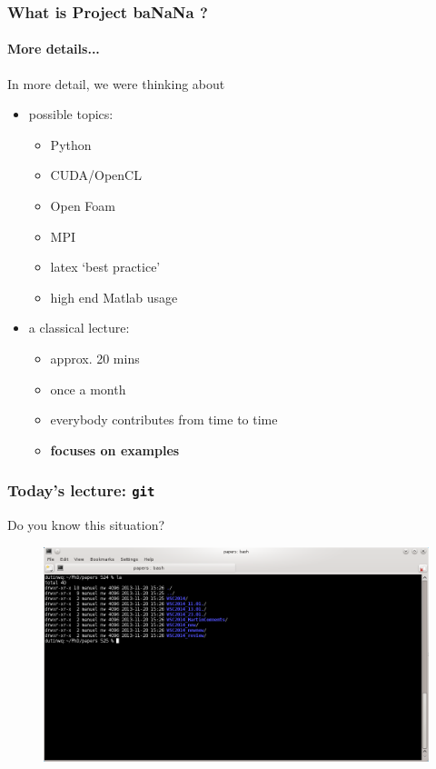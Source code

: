 \documentclass{beamer}
\begin{document}
\begin{frame}
\frametitle{What is Project baNaNa ?}
\framesubtitle{More details...}
In more detail, we were thinking about
\begin{itemize}
 \item possible topics:
 \begin{itemize}
 \item Python
 \item CUDA/OpenCL
 \item Open Foam
 \item MPI
 \item latex `best practice'
 \item high end Matlab usage
 \end{itemize}
 \item a classical lecture:
  \begin{itemize}
 \item approx. 20 mins
 \item once a month
 \item everybody contributes from time to time
 \item \textbf{focuses on examples}
 \end{itemize}
\end{itemize}
\end{frame}
\begin{frame}
\frametitle{Today's lecture: \texttt{git}}
Do you know this situation?
\begin{figure}
\centering
 \includegraphics[height=0.64\textheight]{images/screenshot.png}
\end{figure}
\end{frame}
\end{document}
